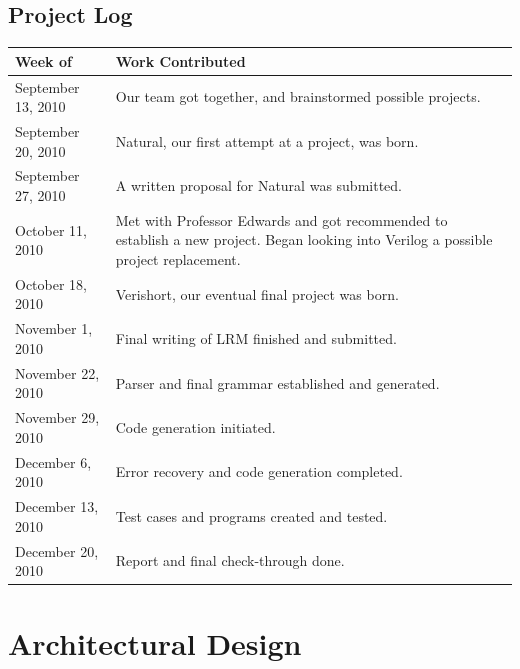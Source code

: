 \documentclass[letterpaper,11pt]{article}
\begin{document}
    
    \subsection{Project Log}
    \begin{center} 
    \begin{tabular}{|l|p{4in}|} \hline
    Week of&Work Contributed\\ \hline
    September 13, 2010 & Our team got together, and brainstormed possible projects. \\
    September 20, 2010 & Natural, our first attempt at a project, was born.\\
    September 27, 2010 & A written proposal for Natural was submitted.\\
    October 11, 2010 & Met with Professor Edwards and got recommended to establish a new project. Began looking into 
    Verilog a possible project replacement. \\
    October 18, 2010 & Verishort, our eventual final project was born.\\
    November 1, 2010 & Final writing of LRM finished and submitted. \\
    November 22, 2010 & Parser and final grammar established and generated. \\ %
    November 29, 2010 & Code generation initiated. \\ %
    December 6, 2010 & Error recovery and code generation completed.\\ %
    December 13, 2010 & Test cases and programs created and tested. \\ %
    December 20, 2010 &  Report and final check-through done. \\ \hline %

    \end{tabular}
    \end{center}

\section{Architectural Design}
\end{document}
